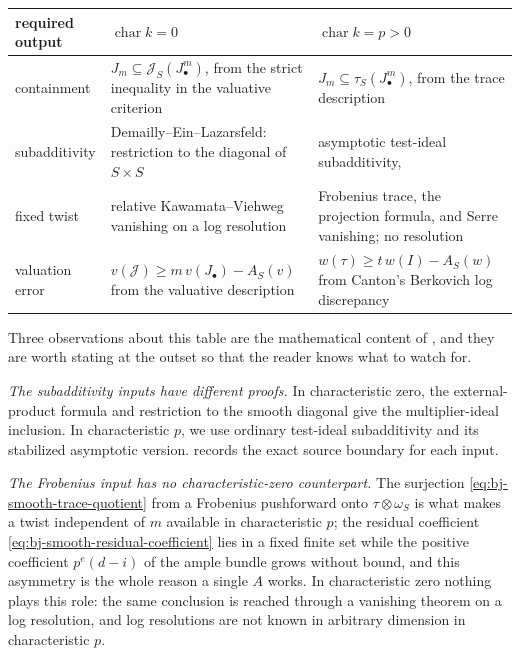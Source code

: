 \begin{center}
\begin{tabular}{p{}p{}p{}}
\toprule
required output & $\operatorname{char}k=0$ & $\operatorname{char}k=p>0$\\
\midrule
containment
 & $J_m\subseteq\mathcal J_S(J_\bullet^m)$, from the strict inequality in
   the valuative criterion
 & $J_m\subseteq\tau_S(J_\bullet^m)$, from the trace description\\
subadditivity
 & Demailly--Ein--Lazarsfeld: restriction to the diagonal of
   $S\times S$
 & asymptotic test-ideal subadditivity,
   \cite[Proposition~3.1(ii)]{MustataTest}\\
fixed twist
 & relative Kawamata--Viehweg vanishing on a log resolution
 & Frobenius trace, the projection formula, and Serre vanishing; no
   resolution\\
valuation error
 & $v(\mathcal J)\ge m\,v(J_\bullet)-A_S(v)$ from the valuative
   description
 & $w(\tau)\ge t\,w(I)-A_S(w)$ from Canton's Berkovich log
   discrepancy\\
\bottomrule
\end{tabular}
\end{center}

Three observations about this table are the mathematical content of
, and they are worth stating at the outset so that
the reader knows what to watch for.

\emph{The subadditivity inputs have different proofs.}  In characteristic
zero, the external-product formula and restriction to the smooth diagonal
give the multiplier-ideal inclusion.  In characteristic $p$, we use
ordinary test-ideal subadditivity and its stabilized asymptotic version.
 records the exact source boundary
for each input.

\emph{The Frobenius input has no characteristic-zero counterpart.}  The
surjection \eqref{eq:bj-smooth-trace-quotient} from a Frobenius pushforward
onto $\tau\otimes\omega_S$ is what makes a twist independent of $m$
available in characteristic $p$; the residual coefficient
\eqref{eq:bj-smooth-residual-coefficient} lies in a fixed finite set while
the positive coefficient $p^e(d-i)$ of the ample bundle grows without
bound, and this asymmetry is the whole reason a single $A$ works.  In
characteristic zero nothing plays this role: the same conclusion is reached
through a vanishing theorem on a log resolution, and log resolutions are not
known in arbitrary dimension in characteristic $p$.

